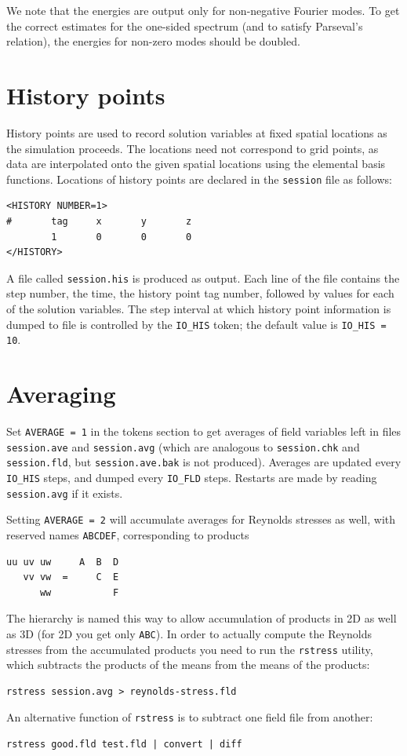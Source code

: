 \documentclass[11pt]{report}
\begin{document}
We note that the energies are output only for non-negative Fourier
modes.  To get the correct estimates for the one-sided spectrum (and
to satisfy Parseval's relation), the energies for non-zero modes
should be doubled.

\section{History points}
\label{sec.history}

History points are used to record solution variables at fixed spatial
locations as the simulation proceeds.  The locations need not
correspond to grid points, as data are interpolated onto the given
spatial locations using the elemental basis functions.  Locations of
history points are declared in the \verb+session+ file as follows:
%
{\small
\begin{verbatim}
<HISTORY NUMBER=1>
#       tag     x       y       z 
        1       0       0       0
</HISTORY>
\end{verbatim}
}
%
A file called \verb+session.his+ is produced as output.  Each line of
the file contains the step number, the time, the history point tag
number, followed by values for each of the solution variables.  The
step interval at which history point information is dumped to file is
controlled by the \verb+IO_HIS+ token; the default value is
\verb+IO_HIS = 10+.

\section{Averaging}
\label{sec.average}

Set \verb+AVERAGE = 1+ in the tokens section to get averages of field
variables left in files \verb+session.ave+ and \verb+session.avg+
(which are analogous to \verb+session.chk+ and \verb+session.fld+, but
\verb+session.ave.bak+ is not produced).  Averages are updated
every \verb+IO_HIS+ steps, and dumped every \verb+IO_FLD+ steps.
Restarts are made by reading \verb+session.avg+ if it exists.

Setting \verb+AVERAGE = 2+ will accumulate averages for Reynolds
stresses as well, with reserved names \verb+ABCDEF+, corresponding to
products
%
{\small
\begin{verbatim}
uu uv uw     A  B  D
   vv vw  =     C  E
      ww           F
\end{verbatim}
}
%
The hierarchy is named this way to allow accumulation of products in 2D
as well as 3D (for 2D you get only \verb+ABC+).  In order to actually
compute the Reynolds stresses from the accumulated products you need
to run the \verb+rstress+ utility, which subtracts the products of the
means from the means of the products:
\begin{verbatim}
rstress session.avg > reynolds-stress.fld
\end{verbatim}
An alternative function of \verb+rstress+ is to subtract one field
file from another:
\begin{verbatim}
rstress good.fld test.fld | convert | diff
\end{verbatim}
\end{document}
